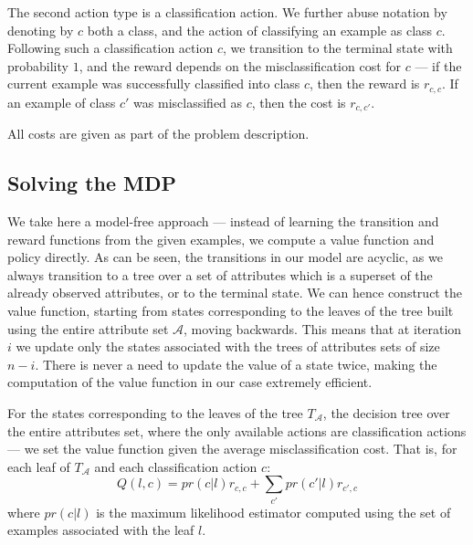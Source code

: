 \documentclass[letterpaper]{article}
\theoremstyle{definition}
\begin{document}
The second action type is a classification action. We further abuse notation by denoting by $c$ both a class, and the action of classifying an example as class $c$. Following such a classification action $c$, we transition to the terminal state with probability $1$, and the reward depends on the misclassification cost for $c$ --- if the current example was successfully classified into class $c$, then the reward is $r_{c,c}$. If an example of class $c'$ was misclassified as $c$, then the cost is $r_{c,c'}$.

All costs are given as part of the problem description.

\subsection{Solving the MDP}


We take here a model-free approach --- instead of learning the transition and reward functions from the given examples, we compute a value function and policy directly. As can be seen, the transitions in our model are acyclic, as we always transition to a tree over a set of attributes which is a superset of the already observed attributes, or to the terminal state. We can hence construct the value function, starting from states corresponding to the leaves of the tree built using the entire attribute set $\mathcal{A}$, moving backwards. This means that at iteration $i$ we update only the states associated with the trees of attributes sets of size $n-i$. There is never a need to update the value of a state twice, making the computation of the value function in our case extremely efficient.

For the states corresponding to the leaves of the tree $T_\mathcal{A}$, the decision tree over the entire attributes set, where the only available actions are classification actions --- we set the value function given the average misclassification cost. That is, for each leaf of $T_\mathcal{A}$ and each classification action $c$:
{\footnotesize
\begin{equation}
\label{eqn:qlc}
Q(l,c) = pr(c|l)r_{c,c} + \sum_{c'}pr(c'|l)r_{c',c}
\end{equation}
}where $pr(c|l)$ is the maximum likelihood estimator computed using the set of examples associated with the leaf $l$.
\end{document}
